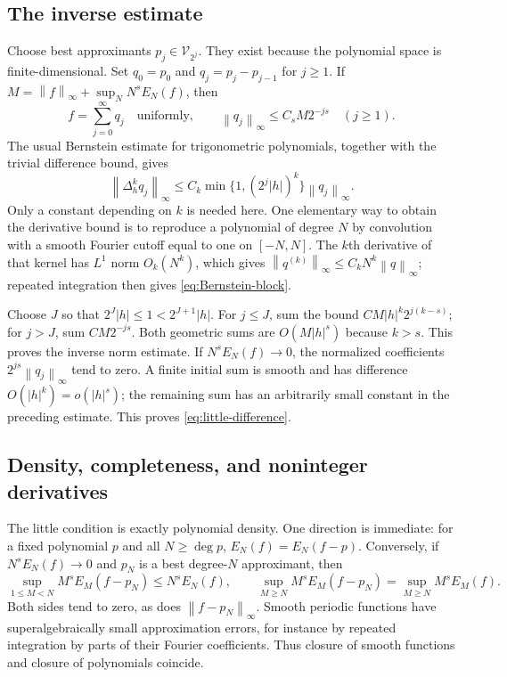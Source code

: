 \documentclass[11pt,a4paper]{article}
\numberwithin{equation}{section}
\theoremstyle{definition}
\theoremstyle{remark}
\newcommand{\V}{\mathcal V}
\newcommand{\norm}[1]{\left\lVert#1\right\rVert}
\begin{document}
\subsection{The inverse estimate}
Choose best approximants $p_j\in\V_{2^j}$. They exist because the
polynomial space is finite-dimensional. Set $q_0=p_0$ and
$q_j=p_j-p_{j-1}$ for $j\ge1$. If
$M=\norm f_\infty+\sup_N N^sE_N(f)$, then
\begin{equation}
 f=\sum_{j=0}^\infty q_j\quad\text{uniformly},\qquad
 \norm{q_j}_\infty\le C_sM2^{-js}\quad(j\ge1).
 \label{eq:dyadic-blocks}
\end{equation}
The usual Bernstein estimate for trigonometric polynomials, together
with the trivial difference bound, gives
\begin{equation}
 \norm{\Delta_h^k q_j}_\infty
 \le C_k\min\{1,(2^j|h|)^k\}\norm{q_j}_\infty.
 \label{eq:Bernstein-block}
\end{equation}
Only a constant depending on $k$ is needed here. One elementary way to
obtain the derivative bound is to reproduce a polynomial of degree
$N$ by convolution with a smooth Fourier cutoff equal to one on
$[-N,N]$. The $k$th derivative of that kernel has $L^1$ norm
$O_k(N^k)$, which gives
$\norm{q^{(k)}}_\infty\le C_kN^k\norm q_\infty$; repeated integration
then gives \eqref{eq:Bernstein-block}.

Choose $J$ so that $2^J|h|\le1<2^{J+1}|h|$.
For $j\le J$, sum the bound
$C M|h|^k2^{j(k-s)}$; for $j>J$, sum
$CM2^{-js}$. Both geometric sums are $O(M|h|^s)$ because $k>s$.
This proves the inverse norm estimate.
If $N^sE_N(f)\to0$, the normalized coefficients
$2^{js}\norm{q_j}_\infty$ tend to zero. A finite initial sum is
smooth and has difference $O(|h|^k)=o(|h|^s)$; the remaining sum has
an arbitrarily small constant in the preceding estimate. This proves
\eqref{eq:little-difference}.

\subsection{Density, completeness, and noninteger derivatives}
The little condition is exactly polynomial density. One direction is
immediate: for a fixed polynomial $p$ and all $N\ge\deg p$,
$E_N(f)=E_N(f-p)$. Conversely, if $N^sE_N(f)\to0$ and $p_N$ is a
best degree-$N$ approximant, then
\[
 \sup_{1\le M<N}M^sE_M(f-p_N)\le N^sE_N(f),
 \qquad
 \sup_{M\ge N}M^sE_M(f-p_N)=\sup_{M\ge N}M^sE_M(f).
\]
Both sides tend to zero, as does $\norm{f-p_N}_\infty$. Smooth
periodic functions have superalgebraically small approximation errors,
for instance by repeated integration by parts of their Fourier
coefficients. Thus closure of smooth functions and closure of
polynomials coincide.
\end{document}
